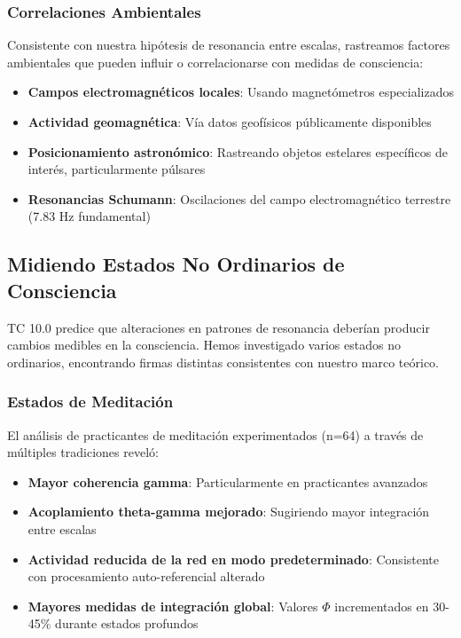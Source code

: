 \documentclass[12pt]{article}
\begin{document}
\subsubsection{Correlaciones Ambientales}

Consistente con nuestra hipótesis de resonancia entre escalas, rastreamos factores ambientales que pueden influir o correlacionarse con medidas de consciencia:

\begin{itemize}
    \item \textbf{Campos electromagnéticos locales}: Usando magnetómetros especializados
    \item \textbf{Actividad geomagnética}: Vía datos geofísicos públicamente disponibles
    \item \textbf{Posicionamiento astronómico}: Rastreando objetos estelares específicos de interés, particularmente púlsares
    \item \textbf{Resonancias Schumann}: Oscilaciones del campo electromagnético terrestre (7.83 Hz fundamental)
\end{itemize}

\subsection{Midiendo Estados No Ordinarios de Consciencia}

TC 10.0 predice que alteraciones en patrones de resonancia deberían producir cambios medibles en la consciencia. Hemos investigado varios estados no ordinarios, encontrando firmas distintas consistentes con nuestro marco teórico.

\subsubsection{Estados de Meditación}

El análisis de practicantes de meditación experimentados (n=64) a través de múltiples tradiciones reveló:

\begin{itemize}
    \item \textbf{Mayor coherencia gamma}: Particularmente en practicantes avanzados
    \item \textbf{Acoplamiento theta-gamma mejorado}: Sugiriendo mayor integración entre escalas
    \item \textbf{Actividad reducida de la red en modo predeterminado}: Consistente con procesamiento auto-referencial alterado
    \item \textbf{Mayores medidas de integración global}: Valores $\Phi$ incrementados en 30-45\% durante estados profundos
\end{itemize}
\end{document}
